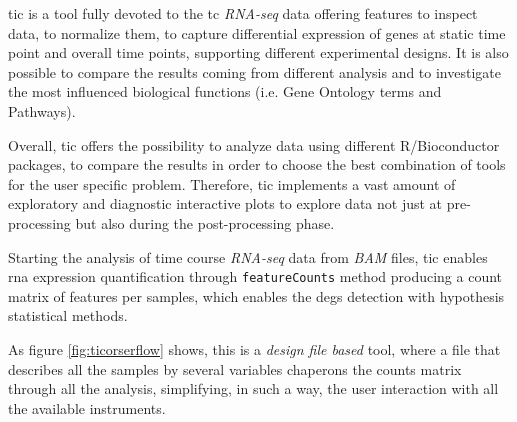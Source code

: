 \gls{tic} is a tool fully devoted to the \gls{tc} \textit{RNA-seq} data offering features to inspect data, to normalize them, to capture differential expression of genes at static time point and overall time points, supporting different experimental designs.
It is also possible to compare the results coming from different analysis and to investigate the most influenced biological functions (i.e. Gene Ontology \cite{GeneOntologyConsortium2004, GeneOntologyConsortium2015} terms and Pathways).

Overall, \gls{tic} offers the possibility to analyze data using different R/Bioconductor \cite{Gentleman2004} packages, to compare the results in order to choose the best combination of tools for the user specific problem. Therefore, \gls{tic} implements a vast amount of exploratory and diagnostic interactive plots to explore data not just at pre-processing but also during the post-processing phase. 


Starting the analysis of time course \textit{RNA-seq} data from \textit{BAM} files, \gls{tic} enables \gls{rna} expression quantification through \lstinline!featureCounts! method \cite{Liao2014} producing a count matrix of features per samples, which enables the \glspl{deg} detection with hypothesis statistical methods.

As figure \ref{fig:ticorserflow} shows, this is a \textit{design file based} tool, where a file that describes all the samples by several variables chaperons the counts matrix through all the analysis, simplifying, in such a way, the user interaction with all the available instruments.

